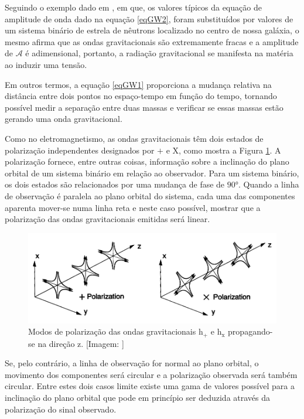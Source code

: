 Seguindo o exemplo dado em \cite{rubbo2007hands}, em que, os valores típicos da equação de amplitude de onda dado na equação \ref{eqGW2}, foram substituídos por valores de um sistema binário de estrela de nêutrons localizado no centro de nossa galáxia, o mesmo afirma que as ondas gravitacionais são extremamente fracas e a amplitude de $\mathcal{A}$ é adimensional, portanto, a radiação gravitacional se manifesta na matéria ao induzir uma tensão. 

Em outros termos, a equação \ref{eqGW1} proporciona a mudança relativa na distância entre dois pontos no espaço-tempo em função do tempo, tornando possível medir a separação entre duas massas e verificar se essas massas estão gerando uma onda gravitacional.

Como no eletromagnetismo, as ondas gravitacionais têm dois estados de polarização independentes designados por $\boldsymbol{+}$ e $\mathrm{X}$, como mostra a Figura \ref{figpolarization}. A polarização fornece, entre outras coisas, informação sobre a inclinação do plano orbital de um sistema binário em relação ao observador. Para um sistema binário, os dois estados são relacionados por uma mudança de fase de $90°$. Quando a linha de observação é paralela ao plano orbital do sistema, cada uma das componentes aparenta mover-se numa linha reta e neste caso possível, mostrar que a polarização das ondas gravitacionais emitidas será linear. 

\begin{figure}[ht]
\centering
\includegraphics[width=.9\textwidth]{figuras/polarization.png}
\caption{Modos de polarização das ondas gravitacionais $\mathrm{h_{+}}$ e $\mathrm{h_{x}}$ propagando-se na direção $\mathrm{z}$. [Imagem: \cite{centrella2010black}]}
\label{figpolarization}
\end{figure}

Se, pelo contrário, a linha de observação for normal ao plano orbital, o movimento dos componentes será circular e a polarização observada será também circular. Entre estes dois casos limite existe uma gama de valores possível para a inclinação do plano orbital que pode em princípio ser deduzida através da polarização do sinal observado.

